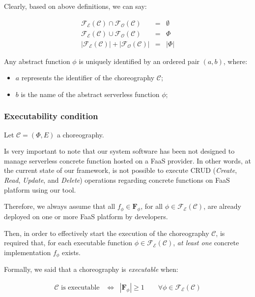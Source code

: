 \documentclass[12pt,a4paper]{report}
\theoremstyle{definition}
\begin{document}
Clearly, based on above definitions, we can say: 

\begin{eqnarray}
	\mathscr{F_E}(\mathcal{C}) \cap \mathscr{F_O}(\mathcal{C}) & = & \emptyset \\
	\mathscr{F_E}(\mathcal{C}) \cup \mathscr{F_O}(\mathcal{C}) & = & \Phi \\
	|\mathscr{F_E}(\mathcal{C})| + |\mathscr{F_O}(\mathcal{C})| &=& |\Phi| 
\end{eqnarray}

Any abstract function $\phi$ is uniquely identified by an ordered pair $(a, b)$, where:
\begin{itemize}
	\item $a$ represents the identifier of the choreography $\mathcal{C}$;
	\item $b$ is the name of the abstract serverless function $\phi$;
\end{itemize}

\subsubsection{Executability condition}

Let $\mathcal{C} = (\Phi,E)$ a choreography.

Is very important to note that our system software has been not designed to manage serverless concrete function hosted on a FaaS provider. In other words, at the current state of our framework, is not possible to execute CRUD (\textit{Create}, \textit{Read}, \textit{Update}, and \textit{Delete}) operations regarding concrete functions on FaaS platform using our tool.

Therefore, we always assume that all $f_{\phi} \in \textbf{F}_{\phi}$, for all $\phi \in \mathscr{F_E}(\mathcal{C})$, are already deployed on one or more FaaS platform by developers. 

Then, in order to effectively start the execution of the choreography $\mathcal{C}$, is required that, for each executable function $\phi \in \mathscr{F_E}(\mathcal{C})$, \textit{at least one} concrete implementation $f_{\phi}$ exists.

Formally, we said that a choreography is \textit{executable} when: 

\begin{eqnarray}
	\label{eqn:SchedulabilityConditionOne}
	\mathcal{C} \text{ is executable } & \Leftrightarrow & |\textbf{F}_{\phi}| \geq 1 \qquad \forall \phi \in \mathscr{F_E}(\mathcal{C})
\end{eqnarray}
\end{document}
